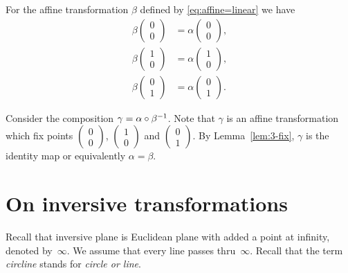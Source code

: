 For the affine transformation $\beta$ defined by \ref{eq:affine=linear}
we have 
\begin{align*}
\beta\left(\begin{smallmatrix}
0\\ 0
\end{smallmatrix} \right)
&=
\alpha\left(\begin{smallmatrix}
0\\ 0
\end{smallmatrix} \right),
\\
\beta\left(\begin{smallmatrix}
1\\ 0
\end{smallmatrix} \right)
&=
\alpha\left(\begin{smallmatrix}
1\\ 0
\end{smallmatrix} \right),
\\
\beta\left(\begin{smallmatrix}
0\\ 1
\end{smallmatrix} \right)
&=
\alpha\left(\begin{smallmatrix}
0\\ 1
\end{smallmatrix} \right).
\end{align*}

Consider the composition $\gamma\z=\alpha\circ \beta^{-1}$.
Note that $\gamma$ is an affine transformation which fix points $\left(\begin{smallmatrix}
0\\ 0
\end{smallmatrix} \right)$, 
$\left(\begin{smallmatrix}
1\\ 0
\end{smallmatrix} \right)$ 
and $\left(\begin{smallmatrix}
0\\ 1
\end{smallmatrix} \right)$.
By Lemma~\ref{lem:3-fix}, $\gamma$ is the identity map or equivalently $\alpha=\beta$.
\qeds

\section*{On inversive transformations}


Recall that inversive plane is Euclidean plane with added a point at infinity, denoted by~$\infty$.
We assume that every line passes thru~$\infty$.
Recall that the term {}\emph{circline} stands for {}\emph{circle or line}.


